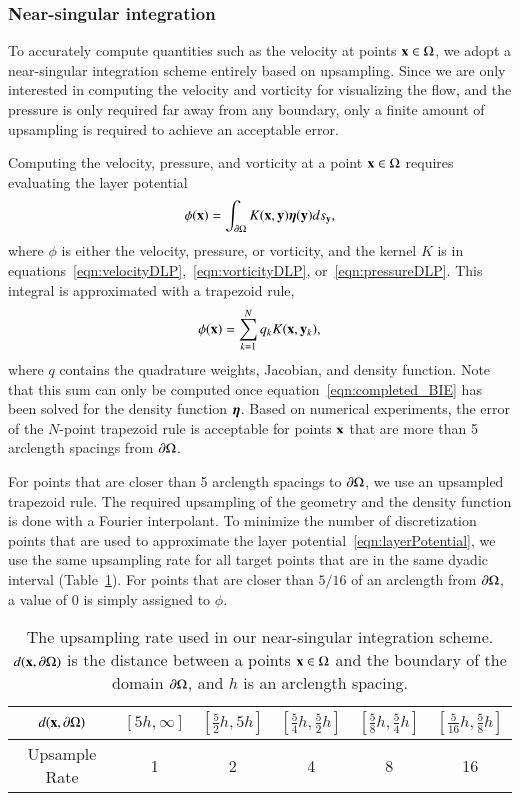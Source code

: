 \documentclass[preprint, 10pt]{elsarticle}
\begin{document}
\subsubsection{Near-singular integration}
To accurately compute quantities such as the velocity at points ${\mathbf{x}} \in
\Omega$, we adopt a near-singular integration scheme entirely based on
upsampling.  Since we are only interested in computing the velocity and
vorticity for visualizing the flow, and the pressure is only required
far away from any boundary, only a finite amount of upsampling is
required to achieve an acceptable error.

Computing the velocity, pressure, and vorticity at a point ${\mathbf{x}} \in
\Omega$ requires evaluating the layer potential
\begin{align*}
  \phi({\mathbf{x}}) = \int_{{\partial}\Omega} K({\mathbf{x}},{\mathbf{y}}) {\boldsymbol\eta}({\mathbf{y}}) ds_{\mathbf{y}},
\end{align*}
where $\phi$ is either the velocity, pressure, or vorticity, and the
kernel $K$ is in
equations~\eqref{eqn:velocityDLP},~\eqref{eqn:vorticityDLP},
or~\eqref{eqn:pressureDLP}.  This integral is approximated with a
trapezoid rule, 
\begin{align}
  \phi({\mathbf{x}}) = \sum_{k=1}^N q_k K({\mathbf{x}},{\mathbf{y}}_k),
  \label{eqn:layerPotential}
\end{align}
where $q$ contains the quadrature weights, Jacobian, and density
function.  Note that this sum can only be computed once
equation~\eqref{eqn:completed_BIE} has been solved for the density
function ${\boldsymbol\eta}$.  Based on numerical experiments, the error of the
$N$-point trapezoid rule is acceptable for points ${\mathbf{x}}$ that are more
than 5 arclength spacings from ${\partial}\Omega$.

For points that are closer than 5 arclength spacings to ${\partial}\Omega$, we
use an upsampled trapezoid rule.  The required upsampling of the
geometry and the density function is done with a Fourier interpolant.
To minimize the number of discretization points that are used to
approximate the layer potential~\eqref{eqn:layerPotential}, we use the
same upsampling rate for all target points that are in the same dyadic
interval (Table~\ref{tbl:upsampling}).  For points that are closer than
$5/16$ of an arclength from ${\partial}\Omega$, a value of 0 is simply assigned
to $\phi$.
\begin{table}[htpb]
\centering
\begin{tabular}{|c|ccccc|}
  \hline
  $d({\mathbf{x}},{\partial}\Omega)$ &
  $[5h,\infty]$ &
  $[\frac{5}{2}h,5h]$ &
  $[\frac{5}{4}h,\frac{5}{2}h]$ & 
  $[\frac{5}{8}h,\frac{5}{4}h]$ &
  $[\frac{5}{16}h,\frac{5}{8}h]$ \\ [2ex]
  \hline
  Upsample Rate & 1 & 2 & 4 & 8 & 16 \\
  \hline
\end{tabular}
\caption{\label{tbl:upsampling}The upsampling rate used in our
near-singular integration scheme.  $d({\mathbf{x}},{\partial}\Omega)$ is the distance
between a points ${\mathbf{x}} \in \Omega$ and the boundary of the domain
${\partial}\Omega$, and $h$ is an arclength spacing.}
\end{table}
\end{document}
